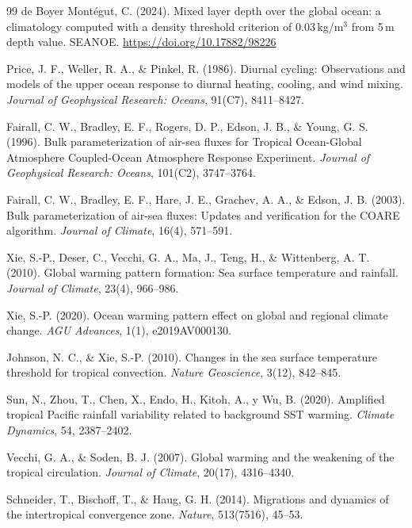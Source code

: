 \documentclass[12pt, a4paper]{article}
\begin{document}
\begin{thebibliography}{99}
	de Boyer Mont\'egut, C. (2024).
	Mixed layer depth over the global ocean: a climatology computed with a density threshold criterion of 0.03\,kg/m$^3$ from 5\,m depth value.
	SEANOE. \url{https://doi.org/10.17882/98226}
	
	Price, J. F., Weller, R. A., \& Pinkel, R. (1986).
	Diurnal cycling: Observations and models of the upper ocean response to diurnal heating, cooling, and wind mixing.
	\textit{Journal of Geophysical Research: Oceans}, 91(C7), 8411--8427.
	
	Fairall, C. W., Bradley, E. F., Rogers, D. P., Edson, J. B., \& Young, G. S. (1996).
	Bulk parameterization of air-sea fluxes for Tropical Ocean-Global Atmosphere Coupled-Ocean Atmosphere Response Experiment.
	\textit{Journal of Geophysical Research: Oceans}, 101(C2), 3747--3764.
	
	Fairall, C. W., Bradley, E. F., Hare, J. E., Grachev, A. A., \& Edson, J. B. (2003).
	Bulk parameterization of air-sea fluxes: Updates and verification for the COARE algorithm.
	\textit{Journal of Climate}, 16(4), 571--591.
	
	Xie, S.-P., Deser, C., Vecchi, G. A., Ma, J., Teng, H., \& Wittenberg, A. T. (2010).
	Global warming pattern formation: Sea surface temperature and rainfall.
	\textit{Journal of Climate}, 23(4), 966--986.
	
	Xie, S.-P. (2020).
	Ocean warming pattern effect on global and regional climate change.
	\textit{AGU Advances}, 1(1), e2019AV000130.
	
	Johnson, N. C., \& Xie, S.-P. (2010).
	Changes in the sea surface temperature threshold for tropical convection.
	\textit{Nature Geoscience}, 3(12), 842--845.
	
	Sun, N., Zhou, T., Chen, X., Endo, H., Kitoh, A., y Wu, B. (2020).
	Amplified tropical Pacific rainfall variability related to background SST warming.
	\textit{Climate Dynamics}, 54, 2387--2402.
	
	Vecchi, G. A., \& Soden, B. J. (2007).
	Global warming and the weakening of the tropical circulation.
	\textit{Journal of Climate}, 20(17), 4316--4340.
	
	Schneider, T., Bischoff, T., \& Haug, G. H. (2014).
	Migrations and dynamics of the intertropical convergence zone.
	\textit{Nature}, 513(7516), 45--53.
	

\end{thebibliography}
\end{document}
